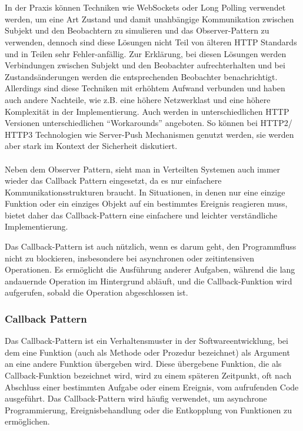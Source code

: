 \\\\
In der Praxis können Techniken wie WebSockets oder Long Polling verwendet werden, um eine Art Zustand und damit unahbängige Kommunikation zwischen Subjekt und den Beobachtern zu simulieren und das Observer-Pattern zu verwenden, dennoch sind diese Lösungen nicht Teil von älteren HTTP Standards und in Teilen sehr Fehler-anfällig. Zur Erklärung, bei diesen Lösungen werden Verbindungen zwischen Subjekt und den Beobachter aufrechterhalten und bei Zustandsänderungen werden die entsprechenden Beobachter benachrichtigt. Allerdings sind diese Techniken mit erhöhtem Aufwand verbunden und haben auch andere Nachteile, wie z.B. eine höhere Netzwerklast und eine höhere Komplexität in der Implementierung. 
Auch werden in unterschiedlichen HTTP Versionen unterschiedlichen \enquote{Workarounds} angeboten. So können bei HTTP2/ HTTP3 Technologien wie Server-Push Mechanismen genutzt werden, sie werden aber stark im Kontext der Sicherheit diskutiert. 
\\\\
Neben dem Observer Pattern, sieht man in Verteilten Systemen auch immer wieder das Callback Pattern eingesetzt, da es nur einfachere Kommunikationsstrukturen braucht. In Situationen, in denen nur eine einzige Funktion oder ein einziges Objekt auf ein bestimmtes Ereignis reagieren muss, bietet daher das Callback-Pattern eine einfachere und leichter verständliche Implementierung.

Das Callback-Pattern ist auch nützlich, wenn es darum geht, den Programmfluss nicht zu blockieren, insbesondere bei asynchronen oder zeitintensiven Operationen. Es ermöglicht die Ausführung anderer Aufgaben, während die lang andauernde Operation im Hintergrund abläuft, und die Callback-Funktion wird aufgerufen, sobald die Operation abgeschlossen ist.

\subsubsection{Callback Pattern}
Das Callback-Pattern ist ein Verhaltensmuster in der Softwareentwicklung, bei dem eine Funktion (auch als Methode oder Prozedur bezeichnet) als Argument an eine andere Funktion übergeben wird. Diese übergebene Funktion, die als Callback-Funktion bezeichnet wird, wird zu einem späteren Zeitpunkt, oft nach Abschluss einer bestimmten Aufgabe oder einem Ereignis, vom aufrufenden Code ausgeführt. Das Callback-Pattern wird häufig verwendet, um asynchrone Programmierung, Ereignisbehandlung oder die Entkopplung von Funktionen zu ermöglichen.

